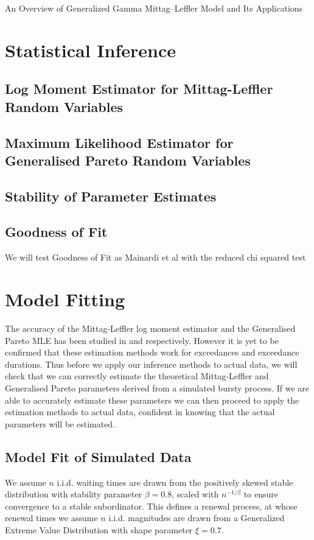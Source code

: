 \documentclass[honours,12pt]{UNSWthesis}
\newcommand{\1}{\mathbf 1}
\numberwithin{equation}{section}
\theoremstyle{definition}
\theoremstyle{remark}
\begin{document}
An Overview of Generalized Gamma Mittag–Leffler Model and Its Applications 


\chapter{Statistical Inference}
\section{Log Moment Estimator for Mittag-Leffler Random Variables}
\section{Maximum Likelihood Estimator for Generalised Pareto Random Variables}
\section{Stability of Parameter Estimates}
\section{Goodness of Fit}%
We will test Goodness of Fit as Mainardi et al with the reduced chi squared test
\chapter{Model Fitting}
The accuracy of the Mittag-Leffler log moment estimator and the Generalised Pareto MLE has been studied 
in \cite{Cahoy2013} and \cite{GPaccuracyCitation} respectively. However it is yet to be confirmed that these estimation methods work for exceedances and exceedance durations. Thus before we apply our inference methods to actual data, we will check that we can correctly estimate the theoretical Mittag-Leffler and Generalised Pareto parameters derived from a simulated bursty process. If we are able to accurately estimate these parameters we can then proceed to apply the estimation methods to actual data, confident in knowing that the actual parameters will be estimated.

\section{Model Fit of Simulated Data}
We assume $n$ i.i.d. waiting times are drawn from the positively skewed stable
distribution with stability parameter $\beta=0.8$, scaled with 
$n^{-1/\beta}$ to ensure convergence to a stable subordinator. This defines a renewal process, at whose renewal times we assume $n$ i.i.d. magnitudes are drawn from a Generalized Extreme Value Distribution
with shape parameter $\xi = 0.7$.
	
\end{document}
